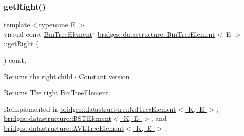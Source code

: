 \mbox{\label{classbridges_1_1datastructure_1_1_bin_tree_element_a795b1696d628b55dafb2bc1aa961843a}} 
\subsubsection{\texorpdfstring{getRight()}{getRight()}\hspace{0.1cm}{\footnotesize\ttfamily [2/2]}}
{\footnotesize\ttfamily template$<$typename E $>$ \\
virtual const \mbox{\hyperlink{classbridges_1_1datastructure_1_1_bin_tree_element}{Bin\+Tree\+Element}}$\ast$ \mbox{\hyperlink{classbridges_1_1datastructure_1_1_bin_tree_element}{bridges\+::datastructure\+::\+Bin\+Tree\+Element}}$<$ E $>$\+::get\+Right (\begin{DoxyParamCaption}{ }\end{DoxyParamCaption}) const\hspace{0.3cm}{\ttfamily [inline]}, {\ttfamily [virtual]}}

Returns the right child -\/ Constant version \begin{DoxyReturn}{Returns}
The right \mbox{\hyperlink{classbridges_1_1datastructure_1_1_bin_tree_element}{Bin\+Tree\+Element}} 
\end{DoxyReturn}


Reimplemented in \mbox{\hyperlink{classbridges_1_1datastructure_1_1_kd_tree_element_ae8d6007d3848b72cbfc11d2e29120781}{bridges\+::datastructure\+::\+Kd\+Tree\+Element$<$ K, E $>$}}, \mbox{\hyperlink{classbridges_1_1datastructure_1_1_b_s_t_element_a012f0eb09c3d62b14c73109e6ded0879}{bridges\+::datastructure\+::\+B\+S\+T\+Element$<$ K, E $>$}}, and \mbox{\hyperlink{classbridges_1_1datastructure_1_1_a_v_l_tree_element_a5a2c4b96b51da1daa3c0426882250acb}{bridges\+::datastructure\+::\+A\+V\+L\+Tree\+Element$<$ K, E $>$}}.

\mbox{\label{classbridges_1_1datastructure_1_1_bin_tree_element_a3b3caddd57fd31963b248b4dbcf3df27}} 

